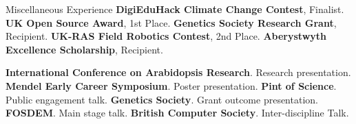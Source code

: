 \begin{rubric}{Miscellaneous Experience}
\entry*[2022] \textbf{DigiEduHack Climate Change Contest}, Finalist.
\entry*[2019] \textbf{UK Open Source Award}, 1st Place.
\entry*[2017] \textbf{Genetics Society Research Grant}, Recipient.
\entry*[2016] \textbf{UK-RAS Field Robotics Contest}, 2nd Place.
\entry*[2014] \textbf{Aberystwyth Excellence Scholarship}, Recipient.


\entry*[2022] \textbf{International Conference on Arabidopsis Research}.
Research presentation.
\entry*[2022] \textbf{Mendel Early Career Symposium}.
Poster presentation.
\entry*[2022] \textbf{Pint of Science}.
Public engagement talk.
\entry*[2018] \textbf{Genetics Society}. Grant outcome presentation.
\entry*[2017] \textbf{FOSDEM}. Main stage talk.
\entry*[2017] \textbf{British Computer Society}. Inter-discipline Talk.



\end{rubric}